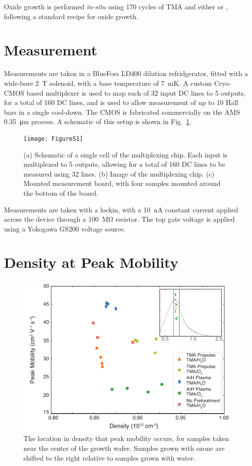 Oxide growth is performed \emph{in-situ} using 170 cycles of TMA and either  or , following a standard recipe for oxide growth.

\section{Measurement}
\label{sec:surf_mulberry}
Measurements are taken in a BlueFors LD400 dilution refridgerator, fitted with a wide-bore \SI{2}{\tesla} solenoid, with a base temperature of \SI{7}{\milli\kelvin}. A custom Cryo-CMOS based multiplexer is used to map each of 32 input DC lines to 5 outputs, for a total of 160 DC lines, and is used to allow measurement of up to 10 Hall bars in a single cool-down. The CMOS is fabricated commercially on the AMS \SI{0.35}{\micro\meter} process. A schematic of this setup is shown in Fig.~\ref{fig:surf_cmos}.

\begin{figure}
    \texttt{[image: FigureS1]}
    \caption[Measurement multiplexing setup]{(a) Schematic of a single cell of the multiplexing chip. Each input is multiplexed to 5 outputs, allowing for a total of 160 DC lines to be measured using 32 lines. (b) Image of the multiplexing chip. (c) Mounted measurement board, with four samples mounted around the bottom of the board.}
    \label{fig:surf_cmos}
\end{figure}

Measurements are taken with a lockin, with a \SI{10}{\nano\ampere} constant current applied across the device through a \SI{100}{\mega\ohm} resistor. The top gate voltage is applied using a Yokogawa GS200 voltage source.

\section{Density at Peak Mobility}
\label{sec:surf_mobden}
\begin{figure}
    \includegraphics[width=0.65\linewidth]{FigureS2}
    \caption[Location in density of peak mobility]{The location in density that peak mobility occurs, for samples taken near the center of the growth wafer. Samples grown with ozone are shifted to the right relative to samples grown with water.}
    \label{fig:surf_mobden}
\end{figure}
